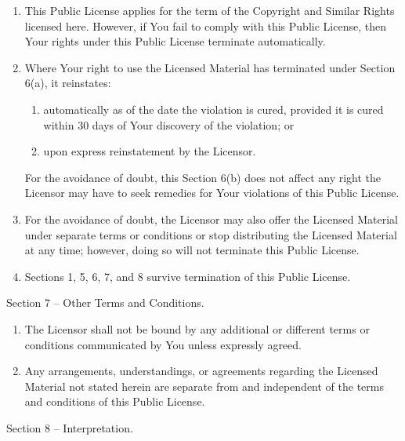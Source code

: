 \documentclass[
]{scrbook}
\begin{document}
\begin{enumerate}
\def\labelenumi{\alph{enumi}.}
\item
  This Public License applies for the term of the Copyright and Similar
  Rights licensed here. However, if You fail to comply with this Public
  License, then Your rights under this Public License terminate
  automatically.
\item
  Where Your right to use the Licensed Material has terminated under
  Section 6(a), it reinstates:

  \begin{enumerate}
  \def\labelenumii{\arabic{enumii}.}
  \item
    automatically as of the date the violation is cured, provided it is
    cured within 30 days of Your discovery of the violation; or
  \item
    upon express reinstatement by the Licensor.
  \end{enumerate}

  For the avoidance of doubt, this Section 6(b) does not affect any
  right the Licensor may have to seek remedies for Your violations of
  this Public License.
\item
  For the avoidance of doubt, the Licensor may also offer the Licensed
  Material under separate terms or conditions or stop distributing the
  Licensed Material at any time; however, doing so will not terminate
  this Public License.
\item
  Sections 1, 5, 6, 7, and 8 survive termination of this Public License.
\end{enumerate}

Section 7 -- Other Terms and Conditions.

\begin{enumerate}
\def\labelenumi{\alph{enumi}.}
\item
  The Licensor shall not be bound by any additional or different terms
  or conditions communicated by You unless expressly agreed.
\item
  Any arrangements, understandings, or agreements regarding the Licensed
  Material not stated herein are separate from and independent of the
  terms and conditions of this Public License.
\end{enumerate}

Section 8 -- Interpretation.
\end{document}
